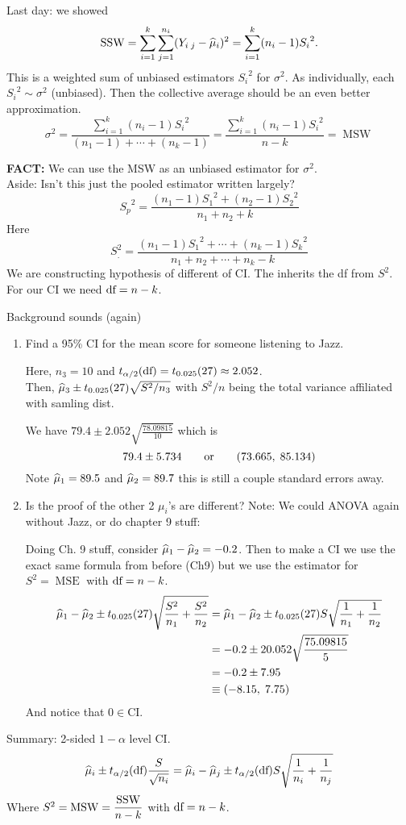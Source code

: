 \nl Last day: we showed
$$\operatorname{SSW} = \sum_{i=1}^k \sum_{j=1}^{n_i} (Y_{i\;j} - \widehat{\mu}_i)^2 = \sum_{i=1}^k (n_i - 1){S_i}^2.$$
This is a weighted sum of unbiased estimators ${S_i}^2$ for $\sigma^2$. As individually, each ${S_i}^2 \sim \sigma^2$ (unbiased). Then the collective average should be an even better approximation.
$$\sigma^2 = \frac{\sum_{i = 1}^k (n_i - 1){S_i}^2}{(n_1 - 1) + \cdots + (n_k -1)} = \frac{\sum_{i=1}^k (n_i - 1) {S_i}^2}{n-k} = \operatorname{MSW}$$

\nl \textbf{FACT:} We can use the MSW as an unbiased estimator for $\sigma^2$.
\\Aside: Isn't this just the pooled estimator written largely?
$${S_p}^2 = \frac{(n_1-1){S_1}^2 + (n_2 - 1){S_2}^2}{n_1 + n_2 + k}$$
Here $$S_{.}^2 = \frac{(n_1-1){S_1}^2 + \cdots + (n_k-1){S_k}^2}{n_1 + n_2 + \cdots + n_k -k}$$
We are constructing hypothesis of different of CI. The  inherits the df from $S^2$. For our CI we need $\text{df} = n-k$.

\example* Background sounds (again)
\begin{enumerate}[label=\alph*.)]
    \item Find a 95\% CI for the mean score for someone listening to Jazz.

    \nl Here, $n_3 =10$ and $t_{\alpha/2}(\text{df}) = t_{0.025}(27) \approx 2.052$.
    \\ Then, $\widehat{\mu}_3 \pm t_{0.025}(27) \sqrt{S^2 / n_3}$ with $S^2/n$ being the total variance affiliated with samling dist.

    We have $\displaystyle 79.4 \pm 2.052 \sqrt{\frac{78.09815}{10}}$ which is
    $$79.4 \pm 5.734 \qquad \text{or} \qquad (73.665, \; 85.134)$$
    Note $\widehat{\mu}_1 = 89.5$ and $\widehat{\mu}_2 = 89.7$ this is still a couple standard errors away.

    \item Is the proof of the other 2 $\mu_i$'s are different? Note: We could ANOVA again without Jazz, or do chapter 9 stuff:

    \nl Doing Ch. 9 stuff, consider $\widehat{\mu}_1 - \widehat{\mu}_2 = -0.2$. Then to make a CI we use the exact same formula from before (Ch9) but we use the  estimator for $S^2 = \operatorname{MSE}$ with $\text{df} = n-k$.
    \begin{align*}
        \muh_1 - \muh_2 \pm t_{0.025}(27)\sqrt{\frac{S^2}{n_1} + \frac{S^2}{n_2}}
        &=         \muh_1 - \muh_2 \pm t_{0.025}(27) S\sqrt{\over{n_1} + \over{n_2}}\\
        &= -0.2 \pm 20.052 \sqrt{\frac{75.09815}{5}}\\
        &= -0.2 \pm 7.95\\
        &\equiv (-8.15, \; 7.75)
    \end{align*}
    And notice that $0 \in \text{CI}$.
\end{enumerate}
Summary: 2-sided $1-\alpha$ level CI.
$$\muh_i \pm t_{\alpha/2}(\df) \frac{S}{\sqrt{n_i}} = \muh_i - \muh_j \pm t_{\alpha/2}(\df) S \sqrt{\over{n_i} + \over{n_j}}$$
Where $S^2 = \operatorname{MSW} = \dfrac{\operatorname{SSW}}{n-k}$ with $\text{df} = n-k$.


